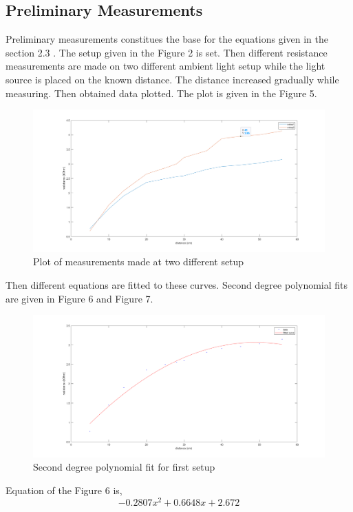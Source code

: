 \documentclass[letterpaper,12pt]{article}
\begin{document}
\subsection{Preliminary Measurements}
Preliminary measurements constitues the base for the equations given in the  section 2.3 . The setup given in the Figure 2 is set. Then different resistance measurements are made on two different ambient light setup while the light source is placed on the known distance. The distance increased gradually while measuring. Then obtained data plotted. The plot is given in the Figure 5.
\begin{figure}[H]
	\centering
   \includegraphics[width=1\textwidth]{figure5.png}
   \caption{Plot of measurements made at two different setup}
\end{figure} 
Then different equations are fitted to these curves. Second degree polynomial fits are given in Figure 6 and Figure 7.
\begin{figure}[H]
	\centering
   \includegraphics[width=1\textwidth]{2open_fit.png}
   \caption{Second degree polynomial fit for first setup}
\end{figure} 
Equation of the Figure 6 is,
\[-0.2807 x^2 + 0.6648x + 2.672\]
\end{document}
